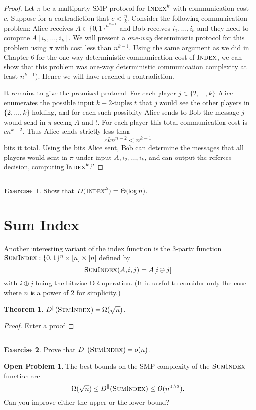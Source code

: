 \documentclass[11pt]{amsart}
\theoremstyle{plain}
\newtheorem{theorem}{Theorem}
\theoremstyle{definition}
\newtheorem{exercise}{Exercise}
\newtheorem{open}{Open Problem}
\theoremstyle{plain}
\newcommand{\Index}{\textsc{Index}}
\newcommand{\SumIndex}{\textsc{SumIndex}}
\newcommand{\exercises}{\bigskip \noindent\rule{8cm}{0.4pt} \medskip}
\begin{document}
\begin{proof}
Let $\pi$ be a multiparty SMP protocol for $\Index^k$ with communication cost $c$. Suppose for a contradiction that $c < \frac{n}{k}$. Consider the following communication problem: Alice receives $A \in \{0,1\}^{n^{k-1}}$ and Bob receives $i_2,\dots, i_k$ and they need to compute $A[i_2,\dots, i_k]$. We will present a \emph{one-way} deterministic protocol for this problem using $\pi$ with cost less than $n^{k-1}$. Using the same argument as we did in Chapter $6$ for the one-way deterministic communication cost of $\Index$, we can show that this problem was one-way deterministic communication complexity at least $n^{{k-1}})$. Hence we will have reached a contradiction.

It remains to give the promised protocol. For each player $j \in \{2, \dots, k\}$ Alice enumerates the possible input $k-2$-tuples $t$ that $j$ would see the other players in $\{2,\dots, k\}$ holding, and for each such possiblity Alice sends to Bob the message $j$ would send in $\pi$ seeing $A$ and $t$. For each player this total communication cost is $cn^{k-2}$. Thus Alice sends strictly less than
$$ckn^{n-2} < n^{k-1}$$
bits it total.
Using the bits Alice sent, Bob can determine the messages that all players would sent in $\pi$ under input $A,i_2,\dots, i_k$, and can output the referees decision, computing $\Index^k$.`'
\end{proof}

\exercises

\begin{exercise}
Show that $D(\Index^k) = \Theta(\log n)$.
\end{exercise}


\newpage 
\section{Sum Index}

Another interesting variant of the index function is the 3-party function $\SumIndex : \{0,1\}^n \times [n] \times [n]$ defined by
\[
\SumIndex(A,i,j) = A[ i \oplus j]
\]
with $i \oplus j$ being the bitwise OR operation. (It is useful to consider only the case where $n$ is a power of $2$ for simplicity.)

\begin{theorem}
$D^\parallel(\SumIndex) = \Omega(\sqrt{n})$.
\end{theorem}

\begin{proof}
Enter a proof

\end{proof}

\exercises

\begin{exercise}
Prove that $D^\parallel(\SumIndex) = o(n)$.
\end{exercise}

\begin{open}
The best bounds on the SMP complexity of the $\SumIndex$ function are
\[
\Omega(\sqrt{n}) \le D^\parallel(\SumIndex) \le O(n^{0.73}).
\]
Can you improve either the upper or the lower bound?
\end{open}
\end{document}
